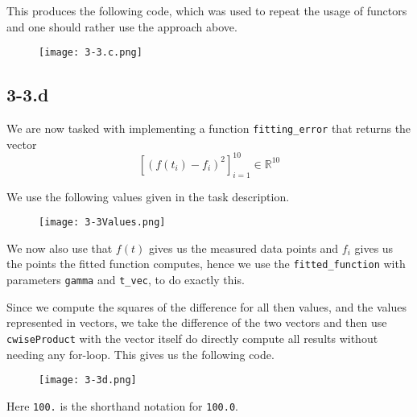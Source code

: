 \documentclass{article}
\begin{document}
\pagebreak

\noindent This produces the following code, which was used to repeat the usage of functors and one should rather use the approach above.

\begin{figure}[!hbt]
    \centering
\texttt{[image: 3-3.c.png]}
\end{figure}

\subsection*{3-3.d}
We are now tasked with implementing a function \verb|fitting_error| that returns the vector
\begin{equation*}
    \left[\left(f\left(t_{i}\right) - f_{i}\right)^{2}\right]_{i=1}^{10} \in \mathbb{R}^{10}
\end{equation*}

We use the following values given in the task description.

\begin{figure}[!hbt]
    \centering
\texttt{[image: 3-3Values.png]}
\end{figure}

\noindent We now also use that $f\left(t\right)$ gives us the measured data points and $f_{i}$ gives us the points the fitted function computes, hence we use the \verb|fitted_function| with parameters \verb|gamma| and \verb|t_vec|, to do exactly this.

\pagebreak

\noindent Since we compute the squares of the difference for all then values, and the values represented in vectors, we take the difference of the two vectors and then use \verb|cwiseProduct| with the vector itself do directly compute all results without needing any for-loop. This gives us the following code.
\begin{figure}[!hbt]
    \centering
\texttt{[image: 3-3d.png]}
\end{figure}

\noindent Here \verb|100.| is the shorthand notation for \verb|100.0|.
\end{document}
